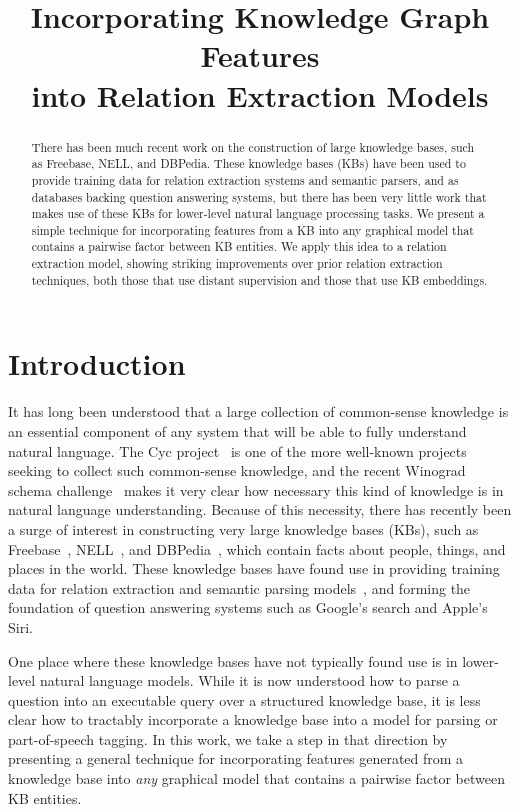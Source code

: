 \documentclass[11pt,a4paper]{article}
\title{Incorporating Knowledge Graph Features\\
into Relation Extraction Models}
\date{}
\begin{document}
\maketitle
\begin{abstract}

  There has been much recent work on the construction of large knowledge bases,
  such as Freebase, NELL, and DBPedia.  These knowledge bases (KBs) have been
  used to provide training data for relation extraction systems and semantic
  parsers, and as databases backing question answering systems, but there has
  been very little work that makes use of these KBs for lower-level natural
  language processing tasks.  We present a simple technique for incorporating
  features from a KB into any graphical model that contains a pairwise factor
  between KB entities.  We apply this idea to a relation extraction model,
  showing striking improvements over prior relation extraction techniques, both
  those that use distant supervision and those that use KB embeddings.

\end{abstract}

\section{Introduction}

It has long been understood that a large collection of common-sense knowledge
is an essential component of any system that will be able to fully understand
natural language.  The Cyc project~\cite{cyc-1995} is one of the more
well-known projects seeking to collect such common-sense knowledge, and the
recent Winograd schema challenge~\cite{winograd-schema-2012} makes it very
clear how necessary this kind of knowledge is in natural language
understanding.  Because of this necessity, there has recently been a surge of
interest in constructing very large knowledge bases (KBs), such as
Freebase~\cite{freebase-2008-bollacker}, NELL~\cite{nell-2015-aaai}, and
DBPedia~\cite{dbpedia-2012-mendes}, which contain facts about people, things,
and places in the world.  These knowledge bases have found use in providing
training data for relation extraction and semantic parsing
models~\cite{riedel-2010-distant-supervision,krishnamurthy-2012-semantic-parsing},
and forming the foundation of question answering systems such as Google's
search and Apple's Siri.

One place where these knowledge bases have not typically found use is in
lower-level natural language models.  While it is now understood how to parse a
question into an executable query over a structured knowledge base, it is less
clear how to tractably incorporate a knowledge base into a model for parsing or
part-of-speech tagging.  In this work, we take a step in that direction by
presenting a general technique for incorporating features generated from a
knowledge base into \emph{any} graphical model that contains a pairwise factor
between KB entities.
\end{document}
